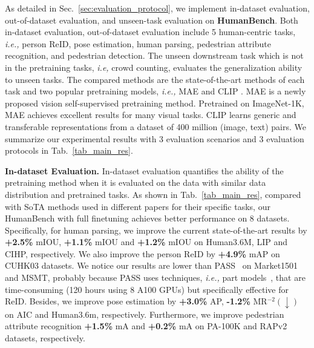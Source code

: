 \documentclass[10pt,twocolumn,letterpaper]{article}
\begin{document}
 
As detailed in Sec.~\ref{sec:evaluation_protocol}, we implement in-dataset evaluation, out-of-dataset evaluation, and unseen-task evaluation on \textbf{HumanBench}. Both in-dataset evaluation, out-of-dataset evaluation include 5 human-centric tasks, \emph{i.e.,} person ReID, pose estimation, human parsing, pedestrian attribute recognition, and pedestrian detection. 
The unseen downstream task which is not in the pretraining tasks, \emph{i.e,} crowd counting, evaluates the generalization ability to unseen tasks. The compared methods are the state-of-the-art methods of each task and two popular pretraining models, \emph{i.e.,} MAE \cite{he2022masked} and CLIP \cite{radford2021learning}. 
MAE is a newly proposed vision self-supervised pretraining method. Pretrained on ImageNet-1K, MAE achieves excellent results for many visual tasks. CLIP learns generic and transferable representations from a dataset of 400 million (image, text) pairs. 
We summarize our experimental results with 3 evaluation scenarios and 3 evaluation protocols in Tab.~\ref{tab_main_res}.

\noindent \textbf{In-dataset Evaluation.} \label{sec:seen}
In-dataset evaluation quantifies the ability of the pretraining method when it is evaluated on the data with similar data distribution and pretrained tasks. As shown in Tab.~\ref{tab_main_res}, compared with SoTA methods used in different papers for their specific tasks, our HumanBench with full finetuning achieves better performance on 8 datasets. Specifically, for human parsing, we improve the current state-of-the-art results by \textbf{+2.5\%} mIOU, \textbf{+1.1\%} mIOU and \textbf{+1.2\%} mIOU on Human3.6M, LIP and CIHP, respectively. We also improve the person ReID by \textbf{+4.9\%} mAP on CUHK03 datasets. We notice our results are lower than PASS~\cite{zhu2022pass} on Market1501 and MSMT, probably because PASS uses techniques, \emph{i.e.,} part models~\cite{wang2018learning,sun2018beyond}, that are time-consuming (120 hours using 8 A100 GPUs) but specifically effective for ReID. Besides, we improve pose estimation by \textbf{+3.0\%} AP, \textbf{-1.2\%} MR$^{-2}$$(\downarrow)$ on AIC and Human3.6m, respectively. Furthermore, we improve pedestrian attribute recognition \textbf{+1.5\%} mA and \textbf{+0.2\%} mA on PA-100K and RAPv2 datasets, respectively.  
\end{document}
